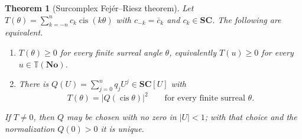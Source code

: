\documentclass[11pt,letterpaper]{article}
\numberwithin{equation}{section}
\newtheorem{theorem}{Theorem}[section]
\theoremstyle{definition}
\theoremstyle{remark}
\newcommand{\No}{\mathbf{No}}
\newcommand{\SC}{\mathbf{SC}}
\newcommand{\TT}{\mathbb T}
\newcommand{\cis}{\operatorname{cis}}
\begin{document}
\begin{theorem}[Surcomplex Fej\'er--Riesz theorem]\label{trigonometry:thm:fejer}
Let $T(\theta)=\sum_{k=-n}^nc_k\cis(k\theta)$ with $c_{-k}=\bar c_k$ and $c_k\in\SC$. The
following are equivalent.
\begin{enumerate}
\item $T(\theta)\ge0$ for \emph{every} finite surreal angle $\theta$, equivalently $T(u)\ge0$ for
 every $u\in\TT(\No)$.
\item There is $Q(U)=\sum_{j=0}^nq_jU^j\in\SC[U]$ with
 \begin{equation}\label{trigonometry:eq:fejer}
 T(\theta)=\bigl|Q(\cis\theta)\bigr|^2\qquad\text{for every finite surreal }\theta .
 \end{equation}
\end{enumerate}
If $T\ne0$, then $Q$ may be chosen with no zero in $|U|<1$; with that choice and the normalization
$Q(0)>0$ it is \emph{unique}.
\end{theorem}
\end{document}
